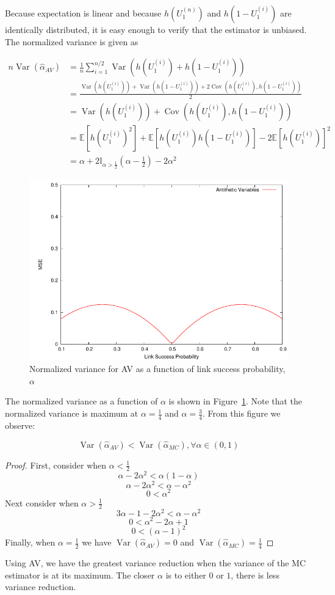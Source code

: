 \documentclass[10pt]{article}
\DeclareMathOperator{\var}{Var}
\DeclareMathOperator{\cov}{Cov}
\begin{document}
Because expectation is linear and because $h(U_{1}^{(n)})$ and $h(1-U_{1}^{(i)})$ are identically distributed, it is easy enough to verify that the estimator is unbiased. The normalized variance is given as

\begin{align*}
n\var\left(\hat{\alpha}_{AV}\right) &= \frac{1}{n}\sum_{i=1}^{n/2}\var\left(h(U_{1}^{(i)}) + h(1-U_{1}^{(i)})\right)\\
&=\frac{\var\left(h(U_{1}^{(i)})\right) + \var\left(h(1-U_{1}^{(i)})\right) + 2\cov\left(h(U_{1}^{(i)}),h(1-U_{1}^{(i)})\right)}{2}\\
&=\var\left(h(U_{1}^{(i)})\right) + \cov\left(h(U_{1}^{(i)}),h(1-U_{1}^{(i)})\right)\\
&=\mathbb{E}\left[h(U_{1}^{(i)})^2\right] + \mathbb{E}\left[h(U_{1}^{(i)})h(1-U_{1}^{(i)})\right] - 2\mathbb{E}\left[h(U_{1}^{(i)})\right]^{2}\\
&=\alpha+ 2\mathbb{I}_{\alpha > \frac{1}{2}}(\alpha-\frac{1}{2})-2\alpha^{2}
\end{align*}

\begin{figure}[ht!]
\centering
\includegraphics[width=0.5\columnwidth]{img/av}
\caption[Normalized variance for \acs{AV} as a function of link success probability, $\alpha$]{Normalized variance for \acf{AV} as a function of link success probability, $\alpha$}\label{fig:av}
\end{figure}

The normalized variance as a function of $\alpha$ is shown in Figure~\ref{fig:av}. Note that the normalized variance is maximum at $\alpha = \frac{1}{4}$ and $\alpha = \frac{3}{4}$. From this figure we observe:
\begin{proposition}\label{prop:av}
\[
\var\left(\hat{\alpha}_{AV}\right) < \var\left(\hat{\alpha}_{MC}\right), \forall \alpha \in (0,1)
\]
\end{proposition}

\begin{proof}
First, consider when $\alpha < \frac{1}{2}$
\[
\alpha - 2\alpha^2  <  \alpha(1-\alpha)
\]
\[
\alpha - 2\alpha^2  <  \alpha-\alpha^2
\]
\[
0  <  \alpha^2
\]
Next consider when $\alpha > \frac{1}{2}$
\[
3\alpha - 1 - 2\alpha^2 < \alpha - \alpha^{2}
\]
\[
0 < \alpha^2 - 2\alpha + 1
\]
\[
0 < (\alpha - 1)^2
\]
Finally, when $\alpha = \frac{1}{2}$ we have $\var\left(\hat{\alpha}_{AV}\right) = 0$ and $\var\left(\hat{\alpha}_{MC}\right) = \frac{1}{4}$
\end{proof}
Using \ac{AV}, we have the greatest variance reduction when the variance of the \ac{MC} estimator is at its maximum. The closer $\alpha$ is to either $0$ or $1$, there is less variance reduction.
\end{document}
